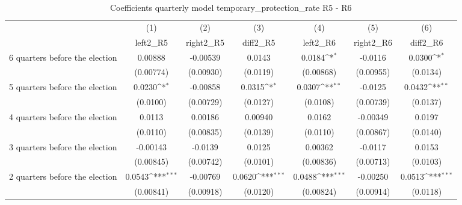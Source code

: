 \begin{table}[!ht]\centering \footnotesize
\def\sym#1{\ifmmode^{#1}\else\(^{#1}\)\fi}
\caption{Coefficients quarterly model temporary\_protection\_rate R5 - R6}
\begin{tabular}{l*{6}{c}}
\hline\hline
                    &\multicolumn{1}{c}{(1)}&\multicolumn{1}{c}{(2)}&\multicolumn{1}{c}{(3)}&\multicolumn{1}{c}{(4)}&\multicolumn{1}{c}{(5)}&\multicolumn{1}{c}{(6)}\\
                    &\multicolumn{1}{c}{left2\_R5}&\multicolumn{1}{c}{right2\_R5}&\multicolumn{1}{c}{diff2\_R5}&\multicolumn{1}{c}{left2\_R6}&\multicolumn{1}{c}{right2\_R6}&\multicolumn{1}{c}{diff2\_R6}\\
\hline
 6 quarters before the election&     0.00888         &    -0.00539         &      0.0143         &      0.0184\sym{*}  &     -0.0116         &      0.0300\sym{*}  \\
                    &   (0.00774)         &   (0.00930)         &    (0.0119)         &   (0.00868)         &   (0.00955)         &    (0.0134)         \\
[1em]
 5 quarters before the election&      0.0230\sym{*}  &    -0.00858         &      0.0315\sym{*}  &      0.0307\sym{**} &     -0.0125         &      0.0432\sym{**} \\
                    &    (0.0100)         &   (0.00729)         &    (0.0127)         &    (0.0108)         &   (0.00739)         &    (0.0137)         \\
[1em]
 4 quarters before the election&      0.0113         &     0.00186         &     0.00940         &      0.0162         &    -0.00349         &      0.0197         \\
                    &    (0.0110)         &   (0.00835)         &    (0.0139)         &    (0.0110)         &   (0.00867)         &    (0.0140)         \\
[1em]
 3 quarters before the election&    -0.00143         &     -0.0139         &      0.0125         &     0.00362         &     -0.0117         &      0.0153         \\
                    &   (0.00845)         &   (0.00742)         &    (0.0101)         &   (0.00836)         &   (0.00713)         &    (0.0103)         \\
[1em]
 2 quarters before the election&      0.0543\sym{***}&    -0.00769         &      0.0620\sym{***}&      0.0488\sym{***}&    -0.00250         &      0.0513\sym{***}\\
                    &   (0.00841)         &   (0.00918)         &    (0.0120)         &   (0.00824)         &   (0.00914)         &    (0.0118)         \\

\end{tabular}
\end{table}
